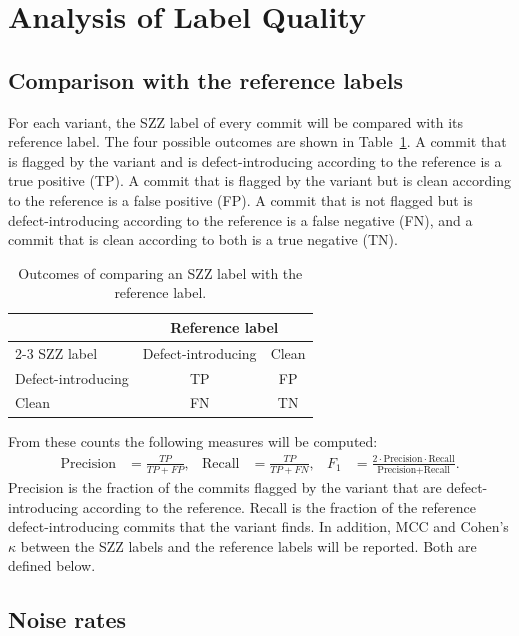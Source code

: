\documentclass[12pt,a4paper,oneside]{report}
\begin{document}
\section{Analysis of Label Quality}\label{sec:quality-method}

\subsection{Comparison with the reference labels}

For each variant, the SZZ label of every commit will be compared with its
reference label. The four possible outcomes are shown in
Table~\ref{tab:confusion}. A commit that is flagged by the variant and is
defect-introducing according to the reference is a true positive (TP). A
commit that is flagged by the variant but is clean according to the reference
is a false positive (FP). A commit that is not flagged but is
defect-introducing according to the reference is a false negative (FN), and a
commit that is clean according to both is a true negative (TN).

\begin{table}[htbp]
\centering\small
\caption{Outcomes of comparing an SZZ label with the reference label.}
\label{tab:confusion}
\begin{tabular}{@{}lcc@{}}
\toprule
 & \multicolumn{2}{c}{Reference label} \\
\cmidrule(l){2-3}
SZZ label & Defect-introducing & Clean \\
\midrule
Defect-introducing & TP & FP \\
Clean & FN & TN \\
\bottomrule
\end{tabular}
\end{table}

From these counts the following measures will be computed:
\begin{align}
\text{Precision} &= \frac{TP}{TP+FP}, &
\text{Recall} &= \frac{TP}{TP+FN}, &
F_1 &= \frac{2\cdot\text{Precision}\cdot\text{Recall}}{\text{Precision}+\text{Recall}}.
\end{align}
Precision is the fraction of the commits flagged by the variant that are
defect-introducing according to the reference. Recall is the fraction of the
reference defect-introducing commits that the variant finds. In addition, MCC
and Cohen's $\kappa$ between the SZZ labels and the reference labels will be
reported. Both are defined below.

\subsection{Noise rates}
\end{document}
